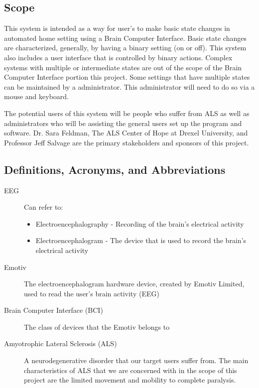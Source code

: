 \documentclass{article}
\begin{document}
\subsection{Scope}

This system is intended as a way for user's to make basic state changes in automated home setting
using a Brain Computer Interface. Basic state changes are characterized, generally, by having a binary 
setting (on or off). This system also includes a user interface that is controlled by binary actions. Complex 
systems with multiple or intermediate states are out of the scope of the Brain Computer Interface portion 
this project. Some settings that have multiple states can be maintained by a administrator. This 
administrator will need to do so via a mouse and keyboard. 

The potential users of this system will be people who suffer from ALS as well as administrators 
who will be assisting the general users set up the program and software. Dr. Sara Feldman, The ALS 
Center of Hope at Drexel University, and Professor Jeff Salvage are the primary stakeholders and 
sponsors of this project.

\subsection{Definitions, Acronyms, and Abbreviations}
\begin{description}
    \item[EEG] Can refer to:
        \begin{itemize}
            \item Electroencephalography - Recording of the brain's electrical
                activity 
	        \item Electroencephalogram - The device that is used to record the
	            brain's electrical activity
        \end{itemize}
    \item[Emotiv] The electroencephalogram hardware device, created by Emotiv
        Limited, used to read the user's brain activity (EEG)
    \item[Brain Computer Interface (BCI)] The class of devices that the Emotiv
        belongs to
    \item[Amyotrophic Lateral Sclerosis (ALS)] A neurodegenerative disorder
        that our target users suffer from. The main characteristics of ALS
        that we are concerned with in the scope of this project are the
        limited movement and mobility to complete paralysis.
\end{description}
\end{document}
